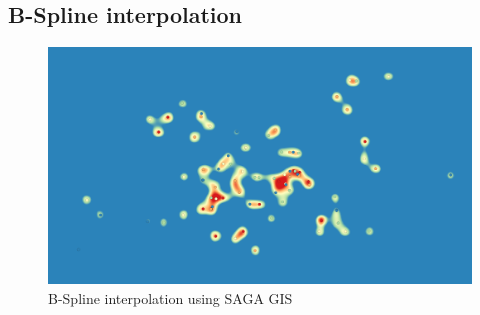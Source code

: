 \subsection{B-Spline interpolation}

\begin{figure}[H]
	\centering
	\includegraphics[width=.7\linewidth]{comparison/compare_bspline_saga.png}
	\caption{B-Spline interpolation using SAGA GIS}
	\label{fig:result_bspline}
\end{figure}
